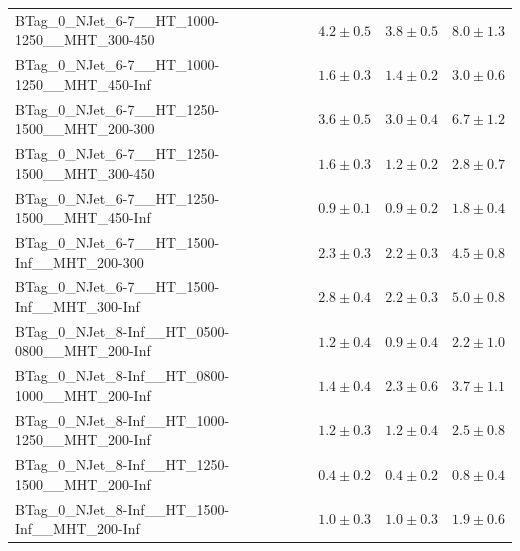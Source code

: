 \documentclass{beamer}
\begin{document}
\begin{frame}
\begin{tabular}{lrrr}
      BTag\_0\_NJet\_6-7\_\_HT\_1000-1250\_\_MHT\_300-450 &               $4.2\pm0.5$&               $3.8\pm0.5$&                   $8.0\pm1.3$ \\
      BTag\_0\_NJet\_6-7\_\_HT\_1000-1250\_\_MHT\_450-Inf &               $1.6\pm0.3$&               $1.4\pm0.2$&                   $3.0\pm0.6$ \\
      BTag\_0\_NJet\_6-7\_\_HT\_1250-1500\_\_MHT\_200-300 &               $3.6\pm0.5$&               $3.0\pm0.4$&                   $6.7\pm1.2$ \\
      BTag\_0\_NJet\_6-7\_\_HT\_1250-1500\_\_MHT\_300-450 &               $1.6\pm0.3$&               $1.2\pm0.2$&                   $2.8\pm0.7$ \\
      BTag\_0\_NJet\_6-7\_\_HT\_1250-1500\_\_MHT\_450-Inf &               $0.9\pm0.1$&               $0.9\pm0.2$&                   $1.8\pm0.4$ \\
       BTag\_0\_NJet\_6-7\_\_HT\_1500-Inf\_\_MHT\_200-300 &               $2.3\pm0.3$&               $2.2\pm0.3$&                   $4.5\pm0.8$ \\
       BTag\_0\_NJet\_6-7\_\_HT\_1500-Inf\_\_MHT\_300-Inf &               $2.8\pm0.4$&               $2.2\pm0.3$&                   $5.0\pm0.8$ \\
    BTag\_0\_NJet\_8-Inf\_\_HT\_0500-0800\_\_MHT\_200-Inf &               $1.2\pm0.4$&               $0.9\pm0.4$&                   $2.2\pm1.0$ \\
    BTag\_0\_NJet\_8-Inf\_\_HT\_0800-1000\_\_MHT\_200-Inf &               $1.4\pm0.4$&               $2.3\pm0.6$&                   $3.7\pm1.1$ \\
    BTag\_0\_NJet\_8-Inf\_\_HT\_1000-1250\_\_MHT\_200-Inf &               $1.2\pm0.3$&               $1.2\pm0.4$&                   $2.5\pm0.8$ \\
    BTag\_0\_NJet\_8-Inf\_\_HT\_1250-1500\_\_MHT\_200-Inf &               $0.4\pm0.2$&               $0.4\pm0.2$&                   $0.8\pm0.4$ \\
     BTag\_0\_NJet\_8-Inf\_\_HT\_1500-Inf\_\_MHT\_200-Inf &               $1.0\pm0.3$&               $1.0\pm0.3$&                   $1.9\pm0.6$ \\

\bottomrule
\end{tabular}
\end{frame}
\end{document}
